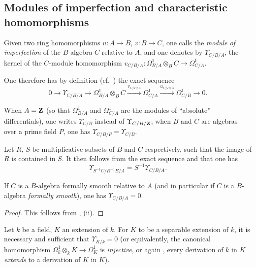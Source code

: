 \subsection{Modules of imperfection and characteristic homomorphisms}
\label{subsection:0.20.6}
\label{0.20.6}

\begin{definition}[20.6.1]
\label{0.20.6.1}
Given two ring homomorphisms $u:A\to B$, $v:B\to C$, one calls the \emph{module of imperfection} of the $B$-algebra $C$ relative to $A$, and one denotes by $\Upsilon_{C/B/A}$, the kernel of the $C$-module homomorphism $v_{C/B/A}:\Omega^1_{B/A}\otimes_B C\to\Omega^1_{C/A}$.
\end{definition}

One therefore has by definition (cf.\ ) the exact sequence
\begin{equation}
\tag{20.6.1.1}
  \label{0.20.6.1.1}
  0\to\Upsilon_{C/B/A}\to\Omega^1_{B/A}\otimes_B C\xrightarrow{v_{C/B/A}}\Omega^1_{C/A}\xrightarrow{u_{C/B/A}}\Omega^1_{C/B}\to 0.
\end{equation}

When $A=\mathbf{Z}$ (so that $\Omega^1_{B/A}$ and $\Omega^1_{C/A}$ are the modules of ``absolute'' differentials), one writes $\Upsilon_{C/B}$ instead of $\Upsilon_{C/B/\mathbf{Z}}$; when $B$ and $C$ are algebras over a prime field $P$, one has $\Upsilon_{C/B/P}=\Upsilon_{C/B}$.

Let $R$, $S$ be multiplicative subsets of $B$ and $C$ respectively, such that the image of $R$ is contained in $S$.
It then follows from the exact sequence  and  that one has
\begin{equation}
\tag{20.6.1.2}
  \label{0.20.6.1.2}
  \Upsilon_{S^{-1}C/R^{-1}B/A}=S^{-1}\Upsilon_{C/B/A}.
\end{equation}

\begin{proposition}[20.6.2]
\label{0.20.6.2}
If $C$ is a $B$-algebra formally smooth relative to $A$ \textup{(and in particular if $C$ is a $B$-algebra \emph{formally smooth})}, one has $\Upsilon_{C/B/A}=0$.
\end{proposition}

\begin{proof}
This follows from , (ii).
\end{proof}

\begin{proposition}[20.6.3]
\label{0.20.6.3}
Let $k$ be a field, $K$ an extension of $k$.
For $K$ to be a separable extension of $k$, it is necessary and sufficient that $\Upsilon_{K/k}=0$ \textup{(or equivalently, the canonical homomorphism $\Omega^1_k\otimes_k K\to\Omega^1_K$ is \emph{injective}, or again , every derivation of $k$ in $K$ \emph{extends} to a derivation of $K$ in $K$)}.
\end{proposition}


